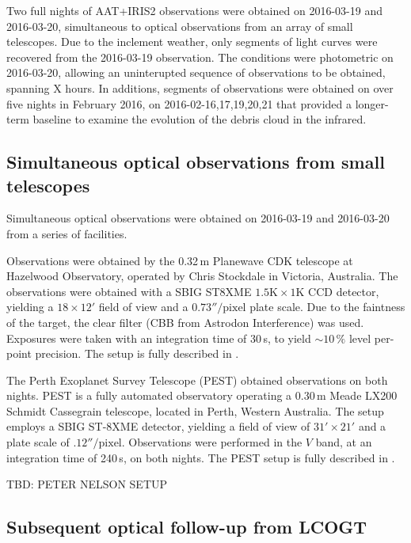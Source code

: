 \documentclass[iop,useAMES,usenatbig]{emulateapj}
\begin{document}
Two full nights of AAT+IRIS2 observations were obtained on 2016-03-19 and 2016-03-20, simultaneous to optical observations from an array of small telescopes. Due to the inclement weather, only segments of light curves were recovered from the 2016-03-19 observation. The conditions were photometric on 2016-03-20, allowing an uninterupted sequence of observations to be obtained, spanning X hours. In additions, segments of observations were obtained on over five nights in February 2016, on 2016-02-16,17,19,20,21 that provided a longer-term baseline to examine the evolution of the debris cloud in the infrared.

\subsection{Simultaneous optical observations from small telescopes}
\label{sec:simultaneous-optical}

Simultaneous optical observations were obtained on 2016-03-19 and 2016-03-20 from a series of facilities. 

Observations were obtained by the 0.32\,m Planewave CDK telescope at Hazelwood Observatory, operated by Chris Stockdale in Victoria, Australia. The observations were obtained with a SBIG ST8XME $1.5\mathrm{K}\times1 \mathrm{K}$ CCD detector, yielding a $18\times12'$ field of view and a $0.73''/\mathrm{pixel}$ plate scale. Due to the faintness of the target, the clear filter (CBB from Astrodon Interference) was used. Exposures were taken with an integration time of 30\,s, to yield $\sim 10\,\text{\%}$ level per-point precision. The setup is fully described in \citet{2015arXiv150908953R}.

The Perth Exoplanet Survey Telescope (PEST) obtained observations on both nights. PEST is a fully automated observatory operating a 0.30\,m Meade LX200 Schmidt Cassegrain telescope, located in Perth, Western Australia. The setup employs a SBIG ST-8XME detector, yielding a field of view of $31'\times 21'$ and a plate scale of $.12''/\mathrm{pixel}$. Observations were performed in the $V$ band, at an integration time of 240\,s, on both nights. The PEST setup is fully described in \citet{2014MNRAS.437.2831Z}. 

TBD: PETER NELSON SETUP

\subsection{Subsequent optical follow-up from LCOGT}
\label{sec:lcogt}
\end{document}
